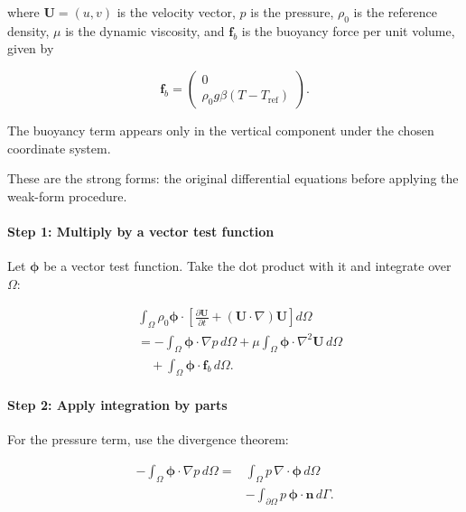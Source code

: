\documentclass{article}
\begin{document}
where $\mathbf{U}=(u,v)$ is the velocity vector,
$p$ is the pressure, $\rho_0$ is the reference density,
$\mu$ is the dynamic viscosity, and $\mathbf{f}_b$
is the buoyancy force per unit volume, given by

\begin{equation}
\mathbf{f}_b=
\begin{pmatrix}
0\\
\rho_0g\beta(T-T_{\mathrm{ref}})
\end{pmatrix}.
\end{equation}

The buoyancy term appears only in the vertical component
under the chosen coordinate system.

These are the strong forms: the original differential
equations before applying the weak-form procedure.

\paragraph{Step 1: Multiply by a vector test function}

Let $\boldsymbol{\phi}$ be a vector test function.
Take the dot product with it and integrate over $\Omega$:

\begin{equation}
\begin{aligned}
&\int_\Omega \rho_0\boldsymbol{\phi}\cdot
\left[
\frac{\partial\mathbf{U}}{\partial t}
+(\mathbf{U}\cdot\nabla)\mathbf{U}
\right]d\Omega\\
&=-\int_\Omega\boldsymbol{\phi}\cdot\nabla p\,d\Omega
+\mu\int_\Omega\boldsymbol{\phi}\cdot
\nabla^2\mathbf{U}\,d\Omega\\
&\quad+\int_\Omega\boldsymbol{\phi}\cdot
\mathbf{f}_b\,d\Omega.
\end{aligned}
\end{equation}

\paragraph{Step 2: Apply integration by parts}

For the pressure term, use the divergence theorem:

\begin{equation}
\begin{aligned}
-\int_\Omega\boldsymbol{\phi}\cdot\nabla p\,d\Omega
={}&\int_\Omega p\,\nabla\cdot\boldsymbol{\phi}\,d\Omega\\
&-\int_{\partial\Omega}p\,
\boldsymbol{\phi}\cdot\mathbf{n}\,d\Gamma.
\end{aligned}
\end{equation}
\end{document}
